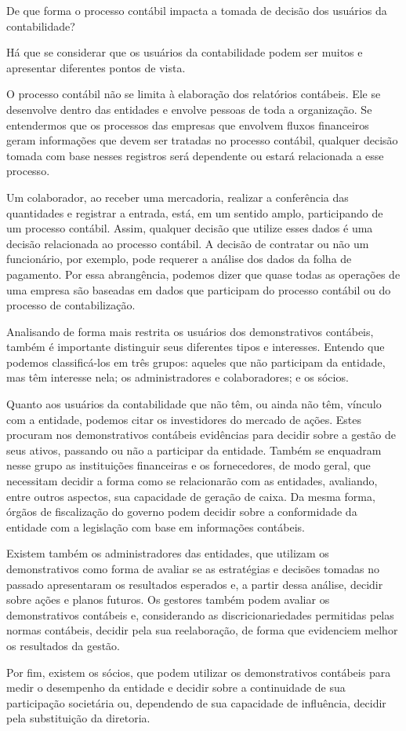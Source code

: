 
De que forma o processo contábil impacta a tomada de decisão dos usuários da contabilidade?

Há que se considerar que os usuários da contabilidade podem ser muitos e apresentar diferentes pontos de vista.

O processo contábil não se limita à elaboração dos relatórios contábeis. Ele se desenvolve dentro das entidades e envolve pessoas de toda a organização. Se entendermos que os processos das empresas que envolvem fluxos financeiros geram informações que devem ser tratadas no processo contábil, qualquer decisão tomada com base nesses registros será dependente ou estará relacionada a esse processo.

Um colaborador, ao receber uma mercadoria, realizar a conferência das quantidades e registrar a entrada, está, em um sentido amplo, participando de um processo contábil. Assim, qualquer decisão que utilize esses dados é uma decisão relacionada ao processo contábil. A decisão de contratar ou não um funcionário, por exemplo, pode requerer a análise dos dados da folha de pagamento. Por essa abrangência, podemos dizer que quase todas as operações de uma empresa são baseadas em dados que participam do processo contábil ou do processo de contabilização.

Analisando de forma mais restrita os usuários dos demonstrativos contábeis, também é importante distinguir seus diferentes tipos e interesses. Entendo que podemos classificá-los em três grupos: aqueles que não participam da entidade, mas têm interesse nela; os administradores e colaboradores; e os sócios.

Quanto aos usuários da contabilidade que não têm, ou ainda não têm, vínculo com a entidade, podemos citar os investidores do mercado de ações. Estes procuram nos demonstrativos contábeis evidências para decidir sobre a gestão de seus ativos, passando ou não a participar da entidade. Também se enquadram nesse grupo as instituições financeiras e os fornecedores, de modo geral, que necessitam decidir a forma como se relacionarão com as entidades, avaliando, entre outros aspectos, sua capacidade de geração de caixa. Da mesma forma, órgãos de fiscalização do governo podem decidir sobre a conformidade da entidade com a legislação com base em informações contábeis.

Existem também os administradores das entidades, que utilizam os demonstrativos como forma de avaliar se as estratégias e decisões tomadas no passado apresentaram os resultados esperados e, a partir dessa análise, decidir sobre ações e planos futuros. Os gestores também podem avaliar os demonstrativos contábeis e, considerando as discricionariedades permitidas pelas normas contábeis, decidir pela sua reelaboração, de forma que evidenciem melhor os resultados da gestão.

Por fim, existem os sócios, que podem utilizar os demonstrativos contábeis para medir o desempenho da entidade e decidir sobre a continuidade de sua participação societária ou, dependendo de sua capacidade de influência, decidir pela substituição da diretoria.
